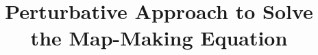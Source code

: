 \documentclass[twocolumn,linenumbers]{aastex631}
\begin{document}
\title{Perturbative Approach to Solve the Map-Making Equation}


\end{document}

